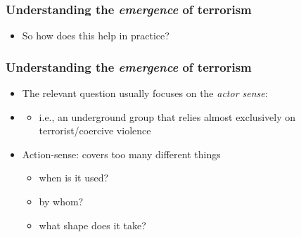 \documentclass[aspectratio=43]{beamer}
\begin{document}
\begin{frame}
\frametitle{Understanding the \textit{emergence} of terrorism}
\centering

\begin{itemize}
  \item So how does this help in practice?
\end{itemize}


\end{frame}

\begin{frame}
\frametitle{Understanding the \textit{emergence} of terrorism}
\centering

\begin{itemize}
  \item The relevant question usually focuses on the \textit{actor sense}:
  \item[] {}
  \begin{itemize}
    \item i.e., an underground group that relies almost exclusively on terrorist/coercive violence
  \end{itemize}
  \item<2-> Action-sense: covers too many different things
  \begin{itemize}
    \item when is it used?
    \item by whom?
    \item what shape does it take?
  \end{itemize}
\end{itemize}


\end{frame}
\end{document}
